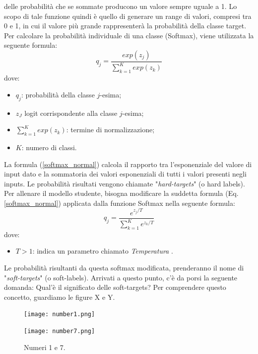 delle probabilità che se sommate producono un valore sempre uguale a 1.  
Lo scopo di tale funzione quindi è quello di generare un range di valori, 
compresi tra 0 e 1, in cui il valore più grande rappresenterà la probabilità 
della classe target. Per calcolare la probabilità individuale di una classe 
(Softmax), viene utilizzata la seguente formula:
\begin{equation}\label{softmax_normal}
    q_j = \frac{exp(z_j)}{\sum_{k=1}^K exp(z_k)}
\end{equation}
dove:
\begin{itemize}
    \item $q_j$: probabilità della classe $j$-esima;
    \item $z_J$ logit corrispondente alla classe $j$-esima;
    \item $\sum_{k=1}^K exp(z_k)$: termine di normalizzazione;
    \item $K$: numero di classi.
\end{itemize}
La formula (\ref{softmax_normal}) calcola il rapporto tra l'esponenziale del valore di input 
dato e la sommatoria dei valori esponenziali di tutti i valori presenti negli 
inputs. Le probabilità risultati vengono chiamate "\emph{hard-targets}" (o hard 
labels). Per allenare il modello studente, bisogna modificare la suddetta 
formula (Eq. \ref{softmax_normal}) applicata dalla funzione Softmax nella seguente formula:
\begin{equation}
    q_j = \frac{e^{z_j/T}}{\sum_{k=1}^K e^{z_k/T}}
\end{equation}
dove:
\begin{itemize}
    \item $T>1$: indica un parametro chiamato \emph{Temperatura} \cite{marino2021compact}.
\end{itemize}
Le probabilità risultanti da questa softmax modificata, prenderanno il nome 
di "\emph{soft-targets}" (o soft-labels). Arrivati a questo punto, c'è da porsi la 
seguente domanda: Qual'è il significato delle soft-targets? Per comprendere 
questo concetto, guardiamo le figure X e Y.
\begin{figure}[]
    \begin{minipage}[t]{.45\textwidth}
        \centering
        \texttt{[image: number1.png]}
    \end{minipage}
    \hfill
    \begin{minipage}[t]{.45\textwidth}
        \centering
        \texttt{[image: number7.png]}
    \end{minipage}  
    \caption{Numeri 1 e 7.}
    \label{numbers_Mnist}
\end{figure}
